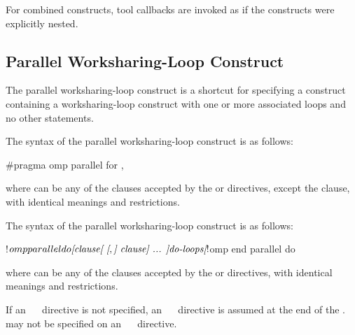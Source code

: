 For combined constructs, tool callbacks are invoked as if the constructs were
explicitly nested.



\subsection{Parallel Worksharing-Loop Construct}
\label{subsec:Parallel Worksharing-Loop Construct}
\summary
The parallel worksharing-loop construct is a shortcut for specifying a 
 construct containing a worksharing-loop construct with 
one or more associated loops and no other statements.

\syntax
\begin{ccppspecific}
The syntax of the parallel worksharing-loop construct is as follows:

\begin{ompcPragma}
#pragma omp parallel for \plc{[clause[ [},\plc{] clause] ... ] new-line}
\end{ompcPragma}

where  can be any of the clauses accepted by the  
or  directives, except the  clause, with identical 
meanings and restrictions.
\end{ccppspecific}

\begin{fortranspecific}
The syntax of the parallel worksharing-loop construct is as follows:

\begin{ompfPragma}
!$omp parallel do \plc{[clause[ [},\plc{] clause] ... ]}
   \plc{do-loops}
\plc{[}!$omp end parallel do\plc{]}
\end{ompfPragma}

where  can be any of the clauses accepted by the  
or  directives, with identical meanings and restrictions.

If an ~~ directive is not specified, an 
~~ directive is assumed at the end of the 
.  may not be specified on an
~~ directive.
\end{fortranspecific}

